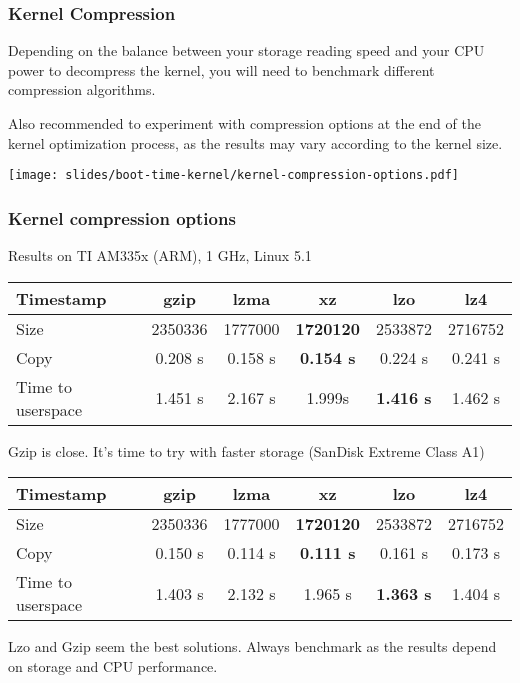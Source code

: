\begin{frame}
\frametitle{Kernel Compression}
Depending on the balance between your storage reading speed and your
CPU power to decompress the kernel, you will need to benchmark
different compression algorithms.

Also recommended to experiment with compression options at the
end of the kernel optimization process, as the results may vary
according to the kernel size.
\begin{center}
    \texttt{[image: slides/boot-time-kernel/kernel-compression-options.pdf]}
\end{center}
\end{frame}

\begin{frame}
\frametitle{Kernel compression options}
Results on TI AM335x (ARM), 1 GHz, Linux 5.1
{\fontsize{7}{10}\selectfont
\begin{tabular}{| l || c | c | c | c | c |}
\hline
Timestamp & gzip & lzma & xz & lzo & lz4 \\
\hline
Size & 2350336 & 1777000 & {\bf 1720120} & 2533872 & 2716752 \\
Copy & 0.208 s & 0.158 s & {\bf 0.154 s} & 0.224 s & 0.241 s \\
Time to userspace & 1.451 s & 2.167 s & 1.999s & {\bf 1.416 s} & 1.462 s \\
\hline
\end{tabular}
}
\vfill{}
Gzip is close. It's time to try with faster storage (SanDisk Extreme
Class A1)
{\fontsize{7}{10}\selectfont
\begin{tabular}{| l || c | c | c | c | c |}
\hline
Timestamp & gzip & lzma & xz & lzo & lz4 \\
\hline
Size & 2350336 & 1777000 & {\bf 1720120} & 2533872 & 2716752 \\
Copy & 0.150 s & 0.114 s & {\bf 0.111 s} & 0.161 s & 0.173 s \\
Time to userspace & 1.403 s & 2.132 s & 1.965 s & {\bf 1.363 s} & 1.404 s \\
\hline
\end{tabular}
}
\newline\newline
Lzo and Gzip seem the best solutions. Always benchmark as the results
depend on storage and CPU performance.
\end{frame}

